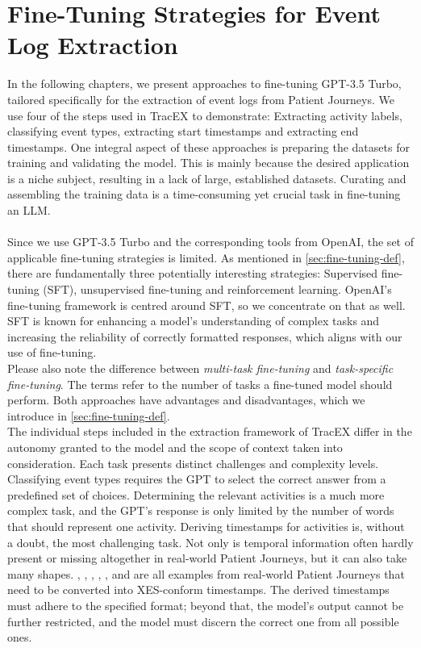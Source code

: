 \section{Fine-Tuning Strategies for Event Log Extraction}\label{sec:fine}
In the following chapters, we present approaches to fine-tuning GPT-3.5 Turbo, tailored specifically for the extraction of event logs from Patient Journeys. We use four of the steps used in TracEX to demonstrate: Extracting activity labels, classifying event types, extracting start timestamps and extracting end timestamps. One integral aspect of these approaches is preparing the datasets for training and validating the model. This is mainly because the desired application is a niche subject, resulting in a lack of large, established datasets. Curating and assembling the training data is a time-consuming yet crucial task in fine-tuning an LLM.\\\\
Since we use GPT-3.5 Turbo and the corresponding tools from OpenAI, the set of applicable fine-tuning strategies is limited. As mentioned in \autoref{sec:fine-tuning-def}, there are fundamentally three potentially interesting strategies: Supervised fine-tuning (SFT), unsupervised fine-tuning and reinforcement learning. OpenAI's fine-tuning framework is centred around SFT, so we concentrate on that as well. SFT is known for enhancing a model's understanding of complex tasks and increasing the reliability of correctly formatted responses, which aligns with our use of fine-tuning.\\
Please also note the difference between \emph{multi-task fine-tuning} and \emph{task-specific fine-tuning}. The terms refer to the number of tasks a fine-tuned model should perform. Both approaches have advantages and disadvantages, which we introduce in \autoref{sec:fine-tuning-def}.\\
The individual steps included in the extraction framework of TracEX differ in the autonomy granted to the model and the scope of context taken into consideration. Each task presents distinct challenges and complexity levels.
Classifying event types requires the GPT to select the correct answer from a predefined set of choices. Determining the relevant activities is a much more complex task, and the GPT's response is only limited by the number of words that should represent one activity. Deriving timestamps for activities is, without a doubt, the most challenging task. Not only is temporal information often hardly present or missing altogether in real-world Patient Journeys, but it can also take many shapes. , , , , , and  are all examples from real-world Patient Journeys that need to be converted into XES-conform timestamps. The derived timestamps must adhere to the specified format; beyond that, the model's output cannot be further restricted, and the model must discern the correct one from all possible ones.\\
